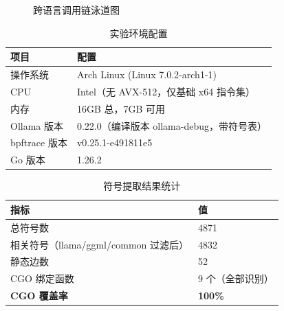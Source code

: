 \documentclass[12pt,a4paper]{ctexbook}
\begin{document}
\begin{figure}[htbp]
\centering
{}
\caption{跨语言调用链泳道图}
\label{fig:cross_language_laned}
\end{figure}
\newpage

\begin{table}[htbp]
\centering
\caption{实验环境配置}
\label{tab:exp_env}
\begin{tabular}{|p{4cm}|p{11cm}|}
\hline
\textbf{项目} & \textbf{配置} \\
\hline
操作系统 & Arch Linux (Linux 7.0.2-arch1-1) \\
\hline
CPU & Intel（无 AVX-512，仅基础 x64 指令集） \\
\hline
内存 & 16GB 总，7GB 可用 \\
\hline
Ollama 版本 & 0.22.0（编译版本 ollama-debug，带符号表） \\
\hline
bpftrace 版本 & v0.25.1-e491811e5 \\
\hline
Go 版本 & 1.26.2 \\
\hline
\end{tabular}
\end{table}
\newpage

\begin{table}[htbp]
\centering
\caption{符号提取结果统计}
\label{tab:symbol_extraction}
\begin{tabular}{|p{8cm}|p{4cm}|}
\hline
\textbf{指标} & \textbf{值} \\
\hline
总符号数 & 4871 \\
\hline
相关符号（llama/ggml/common 过滤后） & 4832 \\
\hline
静态边数 & 52 \\
\hline
CGO 绑定函数 & 9 个（全部识别）\\
\hline
\textbf{CGO 覆盖率} & \textbf{100\%} \\
\hline
\end{tabular}
\end{table}
\newpage
\end{document}
